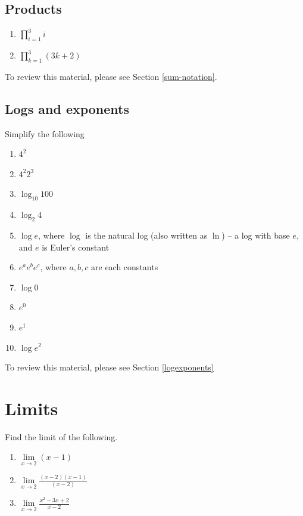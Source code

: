 \documentclass[]{book}
\providecommand{\tightlist}{%
  \setlength{\itemsep}{0pt}\setlength{\parskip}{0pt}}
\theoremstyle{definition}
\theoremstyle{definition}
\theoremstyle{definition}
\theoremstyle{remark}
\begin{document}
\subsection*{Products}\label{products}

\begin{enumerate}
\def\labelenumi{\arabic{enumi}.}
\item
  \(\prod\limits_{i= 1}^3 i\)
\item
  \(\prod\limits_{k=1}^3(3k + 2)\)
\end{enumerate}

To review this material, please see Section \ref{sum-notation}.

\subsection*{Logs and exponents}\label{logs-and-exponents}

Simplify the following

\begin{enumerate}
\def\labelenumi{\arabic{enumi}.}
\tightlist
\item
  \(4^2\)
\item
  \(4^2 2^3\)
\item
  \(\log_{10}100\)
\item
  \(\log_{2}4\)
\item
  \(\log e\), where \(\log\) is the natural log (also written as
  \(\ln\)) -- a log with base \(e\), and \(e\) is Euler's constant
\item
  \(e^a e^b e^c\), where \(a, b, c\) are each constants
\item
  \(\log 0\)
\item
  \(e^0\)
\item
  \(e^1\)
\item
  \(\log e^2\)
\end{enumerate}

To review this material, please see Section \ref{logexponents}

\section*{Limits}\label{limits}

Find the limit of the following.

\begin{enumerate}
\def\labelenumi{\arabic{enumi}.}
\tightlist
\item
  \(\lim\limits_{x \to 2} (x - 1)\)
\item
  \(\lim\limits_{x \to 2} \frac{(x - 2) (x - 1)}{(x - 2)}\)
\item
  \(\lim\limits_{x \to 2}\frac{x^2 - 3x + 2}{x- 2}\)
\end{enumerate}
\end{document}
